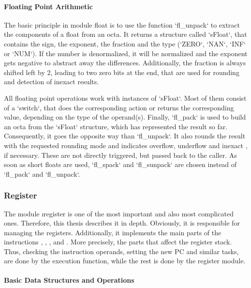 \paragraph{Floating Point Arithmetic}

The basic principle in module float is to use the function `fl_unpack` to extract the components of a float from an octa. It returns a structure called `sFloat`, that contains the sign, the exponent, the fraction and the type (`ZERO`, `NAN`, `INF` or `NUM`). If the number is denormalized, it will be normalized and the exponent gets negative to abstract away the differences. Additionally, the fraction is always shifted left by 2, leading to two zero bits at the end, that are used for rounding and detection of inexact results.

All floating point operations work with instances of `sFloat`. Most of them consist of a `switch`, that does the corresponding action or returns the corresponding value, depending on the type of the operand(s). Finally, `fl_pack` is used to build an octa from the `sFloat` structure, which has represented the result so far. Consequently, it goes the opposite way than `fl_unpack`. It also rounds the result with the requested rounding mode and indicates overflow, underflow and inexact , if necessary. These are not directly triggered, but passed back to the caller. As soon as short floats are used, `fl_spack` and `fl_sunpack` are chosen instead of `fl_pack` and `fl_unpack`.

\subsubsection{Register}

The module \i{register} is one of the most important and also most complicated ones. Therefore, this thesis describes it in depth. Obviously, it is responsible for managing the registers. Additionally, it implements the main parts of the instructions , , ,  and . More precisely, the parts that affect the register stack. Thus, checking the instruction operands, setting the new \gls{PC} and similar tasks, are done by the execution function, while the rest is done by the register module.

\paragraph{Basic Data Structures and Operations}

